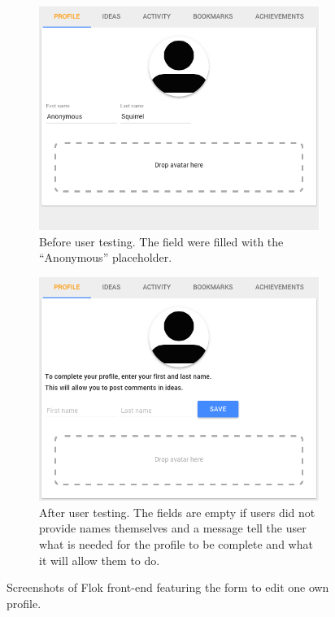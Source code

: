 \documentclass[a4paper,12pt,twoside]{article}
\begin{document}
\begin{figure}[!htb]
    \begin{subfigure}[t]{.495\textwidth}
        \includegraphics[width=\textwidth]{images/user_tests/profileForm_before.png}
        \caption{Before user testing. The field were filled with the “Anonymous” placeholder.}
        \label{fig.tests.profileForm.before}
    \end{subfigure}
    \hfill
    \begin{subfigure}[t]{.495\textwidth}
        \includegraphics[width=\textwidth]{images/user_tests/profileForm_after.png}
        \caption{After user testing. The fields are empty if users did not provide names themselves and a message tell the user what is needed for the profile to be complete and what it will allow them to do.}
        \label{fig.tests.profileForm.after}
    \end{subfigure}
    \caption{Screenshots of Flok front-end featuring the form to edit one own profile.}
    \label{fig.tests.profileForm}
\end{figure}
\end{document}
